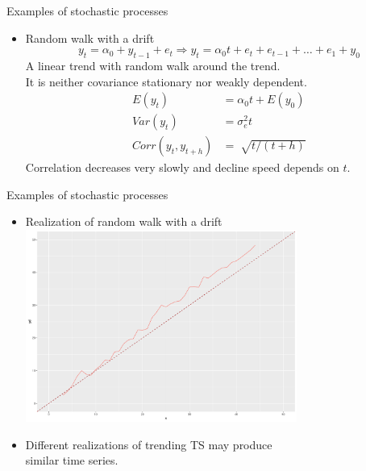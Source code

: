 \documentclass[usenames,dvipsnames]{beamer}
\begin{document}
\begin{frame}{Examples of stochastic processes}
\begin{itemize}
\item Random walk with a drift
$$ y_t=\alpha_0+y_{t-1}+e_t \Rightarrow y_t =\alpha_0 t + e_{t} + e_{t-1} +  \dots +e_1 + y_0$$
A linear trend with random walk around the trend. \\ It is neither covariance stationary nor weakly dependent.
\begin{align}\nonumber
E(y_t) & =\alpha_0 t +E(y_0)\\\nonumber
Var(y_t) & =\sigma^2_e t\\\nonumber
Corr(y_t,y_{t+h}) & =\sqrt[]{t/(t+h)}
\end{align} 
Correlation decreases very slowly and decline speed depends on $t$.
\end{itemize}
\end{frame}


\begin{frame}{Examples of stochastic processes}
\begin{itemize}
\item Realization of random walk with a drift \\ 
\vspace{0.2cm}
\includegraphics[width=0.7\textwidth]{img/random_walk_drift.pdf}

\item Different realizations of trending TS may produce \\similar time series.
\end{itemize}
\end{frame}

\end{document}
